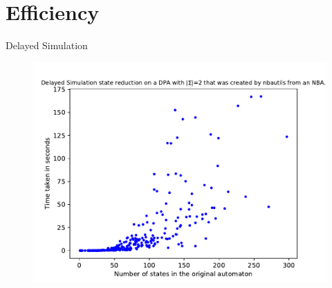 %
%
%
%	







\section{Efficiency}

\begin{frame}{Delayed Simulation}
\begin{figure}
	\centering
	\includegraphics[page=6,height=.8\textheight]{../data/analysis/fritzwilke/detnbaut_ap1.pdf} 
\end{figure}
\end{frame}


